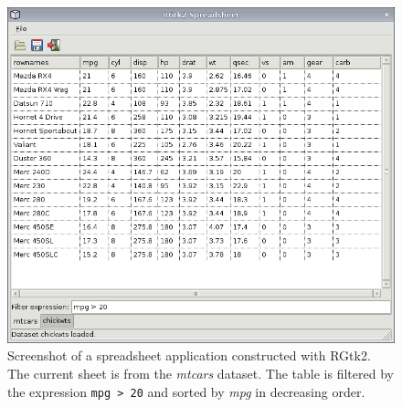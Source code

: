 \documentclass[article]{jss}
\begin{document}


\begin{figure}
\begin{center}
\includegraphics[width=6in]{spreadsheet.png}
\caption{\label{fig:spreadsheet}Screenshot of a spreadsheet
application 
constructed with RGtk2. The current sheet is from the \emph{mtcars}
dataset. The
table is filtered by the expression \texttt{mpg > 20} and sorted by
\emph{mpg}
in decreasing order.}
\end{center}
\end{figure}
\end{document}
